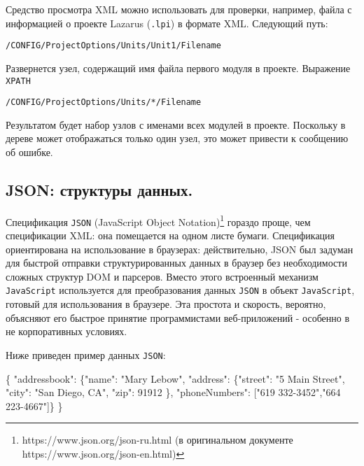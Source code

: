 \documentclass[
]{article}
\newenvironment{Shaded}{}{}
\newcommand{\DataTypeTok}[1]{\textcolor[rgb]{0.56,0.13,0.00}{#1}}
\newcommand{\DecValTok}[1]{\textcolor[rgb]{0.25,0.63,0.44}{#1}}
\newcommand{\FunctionTok}[1]{\textcolor[rgb]{0.02,0.16,0.49}{#1}}
\newcommand{\OtherTok}[1]{\textcolor[rgb]{0.00,0.44,0.13}{#1}}
\newcommand{\StringTok}[1]{\textcolor[rgb]{0.25,0.44,0.63}{#1}}
\begin{document}
Средство просмотра XML можно использовать для проверки, например, файла
с информацией о проекте Lazarus (\texttt{.lpi}) в формате XML. Следующий
путь:

\begin{verbatim}
/CONFIG/ProjectOptions/Units/Unit1/Filename
\end{verbatim}

Развернется узел, содержащий имя файла первого модуля в проекте.
Выражение \texttt{XPATH}

\begin{verbatim}
/CONFIG/ProjectOptions/Units/*/Filename
\end{verbatim}

Результатом будет набор узлов с именами всех модулей в проекте.
Поскольку в дереве может отображаться только один узел, это может
привести к сообщению об ошибке.

\hypertarget{header-n2529}{%
\subsection{JSON: структуры данных.}\label{header-n2529}}

Спецификация \texttt{JSON} (JavaScript Object Notation)\footnote{https://www.json.org/json-ru.html
  (в оригинальном документе https://www.json.org/json-en.html)} гораздо
проще, чем спецификации XML: она помещается на одном листе бумаги.
Спецификация ориентирована на использование в браузерах: действительно,
JSON был задуман для быстрой отправки структурированных данных в браузер
без необходимости сложных структур DOM и парсеров. Вместо этого
встроенный механизм \texttt{JavaScript} используется для преобразования
данных \texttt{JSON} в объект \texttt{JavaScript}, готовый для
использования в браузере. Эта простота и скорость, вероятно, объясняют
его быстрое принятие программистами веб-приложений - особенно в не
корпоративных условиях.

Ниже приведен пример данных \texttt{JSON}:

\begin{Shaded}
\begin{Highlighting}[]
\FunctionTok{\{}
 \DataTypeTok{"addressbook"}\FunctionTok{:} \FunctionTok{\{}\DataTypeTok{"name"}\FunctionTok{:} \StringTok{"Mary Lebow"}\FunctionTok{,} 
     \DataTypeTok{"address"}\FunctionTok{:} \FunctionTok{\{}\DataTypeTok{"street"}\FunctionTok{:} \StringTok{"5 Main Street"}\FunctionTok{,}  \DataTypeTok{"city"}\FunctionTok{:} \StringTok{"San Diego, CA"}\FunctionTok{,} \DataTypeTok{"zip"}\FunctionTok{:} \DecValTok{91912} \FunctionTok{\},} 
\DataTypeTok{"phoneNumbers"}\FunctionTok{:} \OtherTok{[}\StringTok{"619 332{-}3452"}\OtherTok{,}\StringTok{"664 223{-}4667"}\OtherTok{]}\FunctionTok{\}} 
\FunctionTok{\}}
\end{Highlighting}
\end{Shaded}
\end{document}
